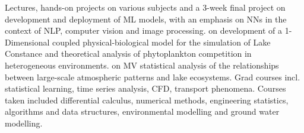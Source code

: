 \documentclass[
	a4paper,
]{fortysecondscv}
\begin{document}
\begin{cvtable}[1.0]
		{Lectures, hands-on projects on various subjects and a 3-week final project on development and deployment of ML models, with an emphasis on NNs in the context of NLP, computer vision and image processing.}
		{\href{https://kops.uni-konstanz.de/bitstream/handle/123456789/16454/Kerimoglu_2011_PhD_Dissertation.pdf?isAllowed=y&sequence=1}{\color{pblue}{Thesis}} on development of a 1-Dimensional coupled physical-biological model for the simulation of Lake Constance and theoretical analysis of phytoplankton competition in heterogeneous environments.}
		{\href{http://etd.lib.metu.edu.tr/upload/12609272/index.pdf}{\color{pblue}{Thesis}} on MV statistical analysis of the relationships between large-scale atmospheric patterns and lake ecosystems. Grad courses incl. statistical learning, time series analysis, CFD, transport phenomena.}
		{Courses taken included differential calculus, numerical methods, engineering statistics, algorithms and data structures, environmental modelling and ground water modelling.}
\end{cvtable}
\end{document}
